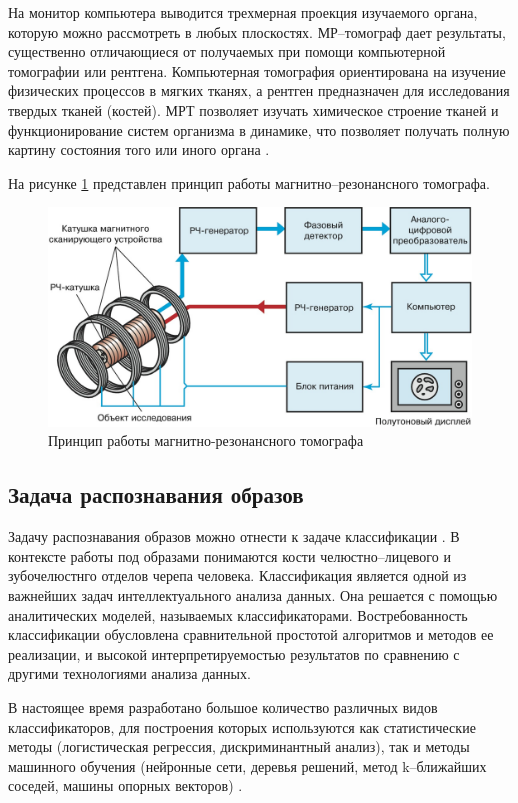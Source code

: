 На монитор компьютера выводится трехмерная проекция изучаемого органа, которую можно рассмотреть в любых плоскостях. МР--томограф дает результаты, существенно отличающиеся от получаемых при помощи компьютерной томографии или рентгена. Компьютерная томография ориентирована на изучение физических процессов в мягких тканях, а рентген предназначен для исследования твердых тканей (костей). МРТ позволяет изучать химическое строение тканей и функционирование систем организма в динамике, что позволяет получать полную картину состояния того или иного органа \cite{mrtprinciple}.

На рисунке \ref{fig:mrt} представлен принцип работы магнитно--резонансного томографа.

\begin{figure}[H]
	\centering
	\includegraphics[width=\textwidth]{img/mrt.jpeg}
	\caption{Принцип работы магнитно-резонансного томографа}
	\label{fig:mrt}
\end{figure}

\subsection{Задача распознавания образов}

Задачу распознавания образов можно отнести к задаче классификации \cite{bones}. В контексте работы под образами понимаются кости челюстно--лицевого и зубочелюстнго отделов черепа человека. Классификация является одной из важнейших задач интеллектуального анализа данных. Она решается с помощью аналитических моделей, называемых классификаторами. Востребованность классификации обусловлена сравнительной простотой алгоритмов и методов ее реализации, и высокой интерпретируемостью результатов по сравнению с другими технологиями анализа данных.

В настоящее время разработано большое количество различных видов классификаторов, для построения которых используются как статистические методы (логистическая регрессия, дискриминантный анализ), так и методы машинного обучения (нейронные сети, деревья решений, метод k--ближайших соседей, машины опорных векторов) \cite{classifiers}.

